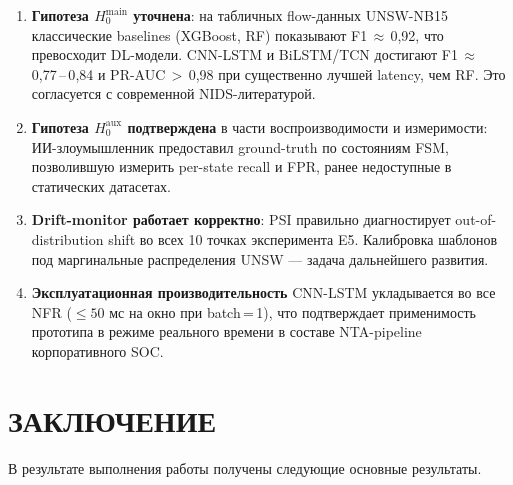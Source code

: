 \documentclass[14pt, a4paper]{extarticle}
\begin{document}
\begin{enumerate}
    \item \textbf{Гипотеза $H_0^{\text{main}}$ уточнена}: на табличных
    flow-данных UNSW-NB15 классические baselines (XGBoost, RF) показывают
    F1\,$\approx$\,0{,}92, что превосходит DL-модели. CNN-LSTM и
    BiLSTM/TCN достигают F1\,$\approx$\,0{,}77\,--\,0{,}84 и
    PR-AUC\,$>$\,0{,}98 при существенно лучшей latency, чем RF.
    Это согласуется с современной NIDS-литературой.
    \item \textbf{Гипотеза $H_0^{\text{aux}}$ подтверждена} в части
    воспроизводимости и измеримости: ИИ-злоумышленник предоставил
    ground-truth по состояниям FSM, позволившую измерить per-state
    recall и FPR, ранее недоступные в статических датасетах.
    \item \textbf{Drift-monitor работает корректно}: PSI правильно
    диагностирует out-of-distribution shift во всех 10 точках
    эксперимента E5. Калибровка шаблонов под маргинальные распределения
    UNSW --- задача дальнейшего развития.
    \item \textbf{Эксплуатационная производительность} CNN-LSTM
    укладывается во все NFR (\(\leq 50\) мс на окно при batch\,=\,1),
    что подтверждает применимость прототипа в режиме реального времени
    в составе NTA-pipeline корпоративного SOC.
\end{enumerate}

\section*{ЗАКЛЮЧЕНИЕ}

В результате выполнения работы получены следующие основные результаты.
\end{document}
